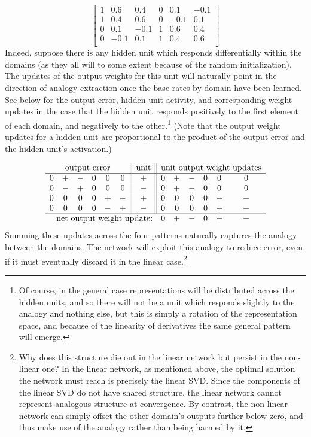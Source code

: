\documentclass[10pt,letterpaper]{article}
\begin{document}
{ 
\[
\left[ \begin{matrix} 
1 & 0.6 & 0.4 & 0 & 0.1 & -0.1 \\
1 & 0.4 & 0.6 & 0 & -0.1 & 0.1 \\
0 & 0.1 & -0.1 & 1 & 0.6 & 0.4  \\
0 & -0.1 & 0.1 & 1 & 0.4 & 0.6  \\
\end{matrix}  \right] 
\] 
}
Indeed, suppose there is any hidden unit which responds differentially within the domains (as they all will to some extent because of the random initialization). The updates of the output weights for this unit will naturally point in the direction of analogy extraction once the base rates by domain have been learned. See below for the output error, hidden unit activity, and corresponding weight updates in the case that the hidden unit responds positively to the first element of each domain, and negatively to the other.\footnote{Of course, in the general case representations will be distributed across the hidden units, and so there will not be a unit which responds slightly to the analogy and nothing else, but this is simply a rotation of the representation space, and because of the linearity of derivatives the same general pattern will emerge.} (Note that the output weight updates for a hidden unit are proportional to the product of the output error and the hidden unit's activation.) \par
\vspace{-1em}
{ 
\[
\begin{array}{cccccc||c||cccccc} 
\multicolumn{6}{c||}{\text{output error}}  & \text{unit}  & \multicolumn{6}{c}{\text{unit output weight updates}} \\
\hline
 0 & + & - & 0 & 0 & 0  &   +    &  0 & + & - & 0 & 0 & 0   \\
0 & - & + & 0 & 0 & 0  &   -  & 0 & + & - & 0 & 0 & 0   \\
 0 & 0 & 0 & 0 & + & - &   +   &  0 & 0 & 0 & 0 & + & - \\
 0 & 0 & 0 & 0 & - & +  &  - &  0 & 0 & 0 & 0 & + & - \\
\hline
\multicolumn{7}{r}{\text{net output weight update:}} &   0 & + & - & 0 & + & - \\
\end{array} 
\]
}
Summing these updates across the four patterns naturally captures the analogy between the domains. The network will exploit this analogy to reduce error, even if it must eventually discard it in the linear case.\footnote{ Why does this structure die out in the linear network but persist in the non-linear one? In the linear network, as mentioned above, the optimal solution the network must reach is precisely the linear SVD. Since the components of the linear SVD do not have shared structure, the linear network cannot represent analogous structure at convergence. By contrast, the non-linear network can simply offset the other domain's outputs further below zero, and thus make use of the analogy rather than being harmed by it.} \par 
\end{document}
